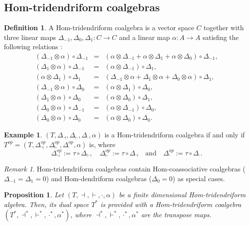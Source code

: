 \documentclass{article}
\newtheorem{prop}[thm]{Proposition}
\theoremstyle{definition}
\newtheorem{defn}[thm]{Definition}
\newtheorem{exam}[thm]{Example}
\theoremstyle{remark}
\newtheorem{rem}[thm]{Remark}
\numberwithin{equation}{section}
\begin{document}
\subsection{Hom-tridendriform coalgebras}
\begin{defn}\label{htca}
A Hom-tridendriform coalgebra is a vector space $C$ together with three linear maps $\Delta_{-1}, \Delta_{0}, \Delta_{1} : C\rightarrow C$ and
 a linear map $\alpha : A\rightarrow A$ satisfing the  following relations :
 \begin{eqnarray}
   (\Delta_{-1}\otimes\alpha)\circ\Delta_{-1}&=&(\alpha\otimes\Delta_{-1}+\alpha\otimes\Delta_1+\alpha\otimes\Delta_0)\circ\Delta_{-1},\label{c1}\\
(\Delta_1\otimes\alpha)\circ\Delta_{-1}&=&(\alpha\otimes\Delta_{-1})\circ\Delta_1,\label{c2}\\
(\alpha\otimes\Delta_1)\circ\Delta_1&=&(\Delta_{-1}\otimes\alpha+\Delta_1\otimes\alpha+\Delta_0\otimes\alpha)\circ\Delta_1,\label{c3}\\
 (\Delta_{-1}\otimes\alpha)\circ\Delta_0&=&(\alpha\otimes\Delta_1)\circ\Delta_0,\label{c4}\\
 (\Delta_1\otimes\alpha)\circ\Delta_0&=&(\alpha\otimes\Delta_0)\circ\Delta_1,\label{c5}\\
 (\Delta_0\otimes\alpha)\circ\Delta_{-1}&=&(\alpha\otimes\Delta_{-1})\circ\Delta_0,\label{c6}\\
 (\Delta_0\otimes\alpha)\circ\Delta_0&=&(\alpha\otimes\Delta_0)\circ\Delta_0.\label{c7}
 \end{eqnarray}
 \end{defn}
 \begin{exam}
 $(T, \Delta_\dashv, \Delta_\vdash, \Delta_\cdot, \alpha)$ is a Hom-tridendriform coalgebra if and only if \\
 $T^{op}=(T, \Delta_\dashv^{op}, \Delta_\vdash^{op}, \Delta_\cdot^{op}, \alpha)$  is, where
$$\Delta_\dashv^{op}:=\tau\circ\Delta_\vdash,\quad \Delta_\vdash^{op}:=\tau\circ\Delta_\dashv \quad\mbox{and}\quad \Delta_\cdot^{op}:=\tau\circ\Delta_\cdot.$$
\end{exam}
 \begin{rem}
  Hom-tridendriform coalgebras contain Hom-coassociative coalgebras \cite{MS} ($\Delta_{-1}=\Delta_1=0$) and Hom-dendriform coalgebras
($\Delta_0=0$) as special cases.
 \end{rem}
 \begin{prop}
 Let  $(T, \dashv, \vdash, \cdot, \alpha)$ be a finite dimensional Hom-tridendriform algebra. Then, its dual space $T^*$ is provided with a
 Hom-tridendriform coalgebra
 $(T^*, \dashv^*, \vdash^*, \cdot^*, \alpha^*)$, where $ \dashv^*, \vdash^*, \cdot^*, \alpha^*$  are the transpose maps.
\end{prop}
\end{document}
